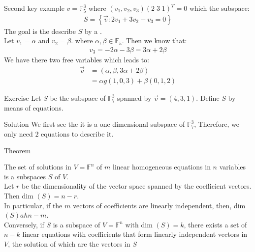 \begin{parag}{Second key example}
    $v = \mathbb{F}_5^3$ where $\left(v_1, v_2, v_3\right)\left(2\; 3\; 1\right)^T = 0$ which the subspace:
    \begin{align*}
        S =  \left\{\vec{v}: 2v_1 + 3v_2 + v_3 = 0\right\}
    \end{align*}
    The goal is the describe $S$ by a .\\
    Let $v_1 = \alpha$ and $v_2 =  \beta$. where $\alpha, \beta \in \mathbb{F}_5$. Then we know that:
    \begin{align*} v_3 =  -2\alpha - 3\beta =  3\alpha + 2\beta \end{align*}
    We have there two free variables which leads to:
    \begin{align*} 
        \vec{v} &= \left(\alpha, \beta, 3\alpha + 2\beta\right)\\
                &= \alpha g \left(1, 0, 3\right) + \beta\left(0, 1, 2\right)
    \end{align*}
\end{parag}
\begin{parag}{Exercise}
    Let $S$ be the subspace of $\mathbb{F}_7^3$ spanned by $\vec{v} =  \left(4, 3, 1\right)$. Define $S$ by means of equations.
\end{parag}
\begin{parag}{Solution}
    We first see the it is a one dimensional subspace of $\mathbb{F}_7^3$, Therefore, we only need $2$ equations to describe it.\\

\end{parag}
\begin{parag}{Theorem}
    \begin{theoreme}
    The set of solutions in $V = \mathbb{F}^n$ of $m$ linear homogeneous equations in $n$ variables is a subspaces $S$ of $V$.\\
    Let $r$ be the dimensionality of the vector space spanned by the coefficient vectors. Then dim $\left(S\right) =  n-r$.\\
    In particular, if the $m$ vectors of coefficients are linearly independent, then, dim $\left(S\right) ah n-m$.\\
    Conversely, if $S$ is a subspace  of $V =  \mathbb{F}^n$ with dim $\left(S\right) = k$, there exists a set of $n-k$ linear equations with coefficients that form linearly independent vectors in $V$, the solution of which are the vectors in $S$
    \end{theoreme}
\end{parag}


